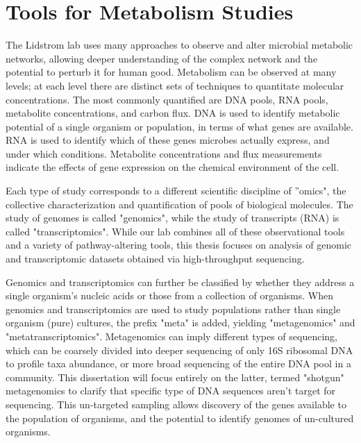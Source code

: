 \section{Tools for Metabolism Studies}
The Lidstrom lab uses many approaches to observe and alter microbial metabolic networks, allowing deeper understanding of the complex network and the potential to perturb it for human good.
Metabolism can be observed at many levels; at each level there are distinct sets of techniques to quantitate molecular concentrations.
The most commonly quantified are DNA pools, RNA pools, metabolite concentrations, and carbon flux.
DNA is used to identify metabolic potential of a single organism or population, in terms of what genes are available.
RNA is used to identify which of these genes microbes actually express, and under which conditions.
Metabolite concentrations and flux measurements indicate the effects of gene expression on the chemical environment of the cell.

Each type of study corresponds to a different scientific discipline of ''omics", the collective characterization and quantification of pools of biological molecules.
The study of genomes is called "genomics", while the study of transcripts (RNA) is called "transcriptomics".
While our lab combines all of these observational tools and a variety of pathway-altering tools, this thesis focuses on analysis of genomic and transcriptomic datasets obtained via high-throughput sequencing.


Genomics and transcriptomics can further be classified by whether they address a single organism's nucleic acids or those from a collection of organisms.
When genomics and transcriptomics are used to study populations rather than single organism (pure) cultures, the prefix "meta" is added, yielding "metagenomics" and "metatranscriptomics".
Metagenomics can imply different types of sequencing, which can be coarsely divided into deeper sequencing of only 16S ribosomal DNA to profile taxa abundance, or more broad sequencing of the entire DNA pool in a community.
This dissertation will focus entirely on the latter, termed "shotgun" metagenomics to clarify that specific type of DNA sequences aren't target for sequencing.
This un-targeted sampling allows discovery of the genes available to the population of organisms, and the potential to identify genomes of un-cultured organisms.

